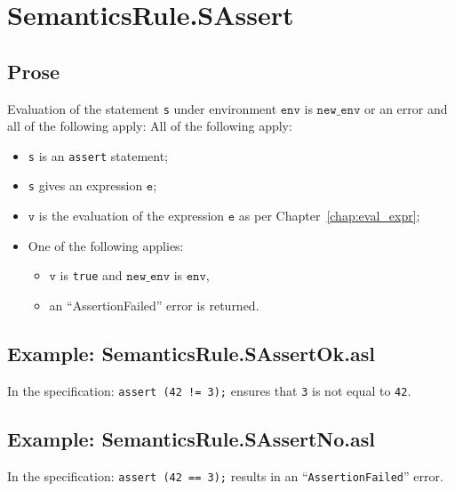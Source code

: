 \documentclass{book}
\newcommand\newenv[0]{\texttt{new\_env}}
\newcommand\env[0]{\texttt{env}}
\newcommand\ve[0]{\texttt{e}}
\newcommand\vv[0]{\texttt{v}}
\begin{document}

\section{SemanticsRule.SAssert \label{sec:SemanticsRule.SAssert}}

    \subsection{Prose}
  Evaluation of the statement \texttt{s} under environment $\env$ is
$\newenv$ or an error and all of the following apply:
    All of the following apply:
    \begin{itemize}
    \item \texttt{s} is an \texttt{assert} statement;
    \item \texttt{s} gives an expression $\ve$;
    \item $\vv$ is the evaluation of the expression $\ve$ as per Chapter~\ref{chap:eval_expr};
    \item One of the following applies:
          \begin{itemize}
          \item $\vv$ is \texttt{true} and $\newenv$ is $\env$,
          \item an ``AssertionFailed'' error is returned.
          \end{itemize}
    \end{itemize}

    \subsection{Example: SemanticsRule.SAssertOk.asl}
    In the specification:
    \texttt{assert (42 != 3);} ensures that \texttt{3} is not equal to \texttt{42}.

    \subsection{Example: SemanticsRule.SAssertNo.asl}
    In the specification:
    \texttt{assert (42 == 3);} results in an ``\texttt{AssertionFailed}'' error.
\end{document}
